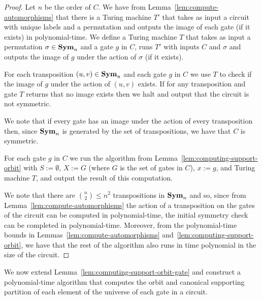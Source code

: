 \documentclass[../paper.tex]{subfiles}
\begin{document}
\begin{proof}
  Let $n$ be the order of $C$. We have from
  Lemma~\ref{lem:compute-automorphisms} that there is a Turing machine $T'$ that
  takes as input a circuit with unique labels and a permutation and outputs the
  image of each gate (if it exists) in polynomial-time. We define a Turing
  machine $T$ that takes as input a permutation $\sigma \in \text{\textbf{Sym}}_n$ and a gate
  $g$ in $C$, runs $T'$ with inputs $C$ and $\sigma$ and outputs the image of
  $g$ under the action of $\sigma$ (if it exists).

  For each transposition $(u,v) \in \text{\textbf{Sym}}_n$ and each gate $g$ in $C$ we use $T$
  to check if the image of $g$ under the action of $(u,v)$ exists. If for any
  transposition and gate $T$ returns that no image exists then we halt and
  output that the circuit is not symmetric.

  We note that if every gate has an image under the action of every
  transposition then, since $\text{\textbf{Sym}}_n$ is generated by the set of transpositions,
  we have that $C$ is symmetric.

  For each gate $g$ in $C$ we run the algorithm from
  Lemma~\ref{lem:computing-support-orbit} with $S := \emptyset$, $X := G$ (where
  $G$ is the set of gates in $C$), $x := g$, and Turing machine $T$, and output
  the result of this computation.
  
  We note that there are ${{n}\choose{2}} \leq n^2$ transpositions in $\text{\textbf{Sym}}_n$
  and so, since from Lemma~\ref{lem:compute-automorphisms} the action of a
  transposition on the gates of the circuit can be computed in polynomial-time,
  the initial symmetry check can be completed in polynomial-time. Moreover, from
  the polynomial-time bounds in Lemmas~\ref{lem:compute-automorphisms}
  and~\ref{lem:computing-support-orbit}, we have that the rest of the algorithm
  also runs in time polynomial in the size of the circuit.
\end{proof}

We now extend Lemma~\ref{lem:computing-support-orbit-gate} and construct a
polynomial-time algorithm that computes the orbit and canonical supporting
partition of each element of the universe of each gate in a circuit.
\end{document}
